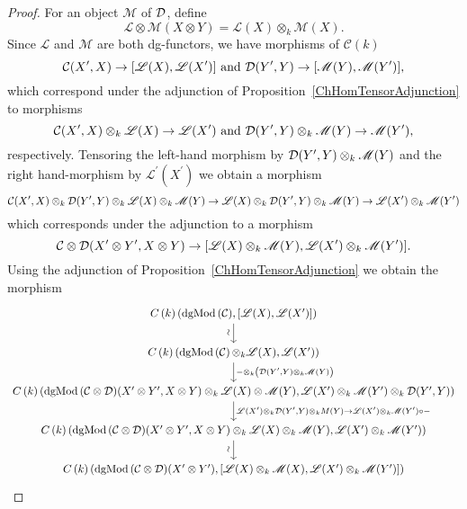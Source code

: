 \documentclass[dissertation.tex]{subfiles}
\begin{document}
\begin{lem}
  \begin{proof}
    For an object $\mathscr{M}$ of $\mathcal{D}$, define 
    $$\mathscr{L} \otimes \mathscr{M}(X \otimes Y) = \mathscr{L}(X) \otimes_k \mathscr{M}(X).$$
    Since $\mathscr{L}$ and $\mathscr{M}$ are both dg-functors, we have morphisms of $\mathcal{C}(k)$
    $$\mathcal{C}(X^\prime, X) \to [\mathscr{L}(X), \mathscr{L}(X^\prime)]\ \text{and}\ \mathcal{D}(Y^\prime, Y) \to [\mathscr{M}(Y), \mathscr{M}(Y^\prime)],$$
    which correspond under the adjunction of Proposition~\ref{ChHomTensorAdjunction} to morphisms
    $$\C(X^\prime, X) \otimes_k \mathscr{L}(X) \to \mathscr{L}(X^\prime)
    \ \text{and}\ 
    \D(Y^\prime, Y) \otimes_k \mathscr{M}(Y) \to \mathscr{M}(Y^\prime),$$
    respectively.
    Tensoring the left-hand morphism by $\mathcal{D}(Y^\prime,Y) \otimes_k \mathscr{M}(Y)$ and the right hand-morphism by $\mathscr{L^\prime}(X^\prime)$ we obtain a morphism
    $$\mathcal{C}(X^\prime, X) \otimes_k \mathcal{D}(Y^\prime, Y) \otimes_k \mathscr{L}(X) \otimes_k \mathscr{M}(Y) \to 
    \mathscr{L}(X) \otimes_k \mathcal{D}(Y^\prime,Y) \otimes_k \mathscr{M}(Y) \to
    \mathscr{L}(X^\prime) \otimes_k \mathscr{M}(Y^\prime)$$
    which corresponds under the adjunction to a morphism
    $$\mathcal{C} \otimes \mathcal{D}(X^\prime \otimes Y^\prime, X \otimes Y) \to
    [\mathscr{L}(X) \otimes_k \mathscr{M}(Y), \mathscr{L}(X^\prime) \otimes_k \mathscr{M}(Y^\prime)].$$
    Using the adjunction of Proposition~\ref{ChHomTensorAdjunction} we obtain the morphism
    $$\begin{tikzcd}
      \Ch{k}(\cdg{\C}, [\funct{L}(X), \funct{L}(X^\prime)]) \arrow{d}[rotate=90,xshift=-1ex,yshift=1ex]{\sim}\\
      \Ch{k}(\cdg{\C} \otimes_k \funct{L}(X), \funct{L}(X^\prime))\arrow{d}{- \otimes_k \left(\D(Y^\prime, Y) \otimes_k \funct{M}(Y)\right)}\\
      \Ch{k}(\cdg{\C \otimes \D}(X^\prime \otimes Y^\prime, X \otimes Y) \otimes_k \funct{L}(X) \otimes \funct{M}(Y), \funct{L}(X^\prime) \otimes_k \funct{M}(Y^\prime) \otimes_k \D(Y^\prime, Y))
      \arrow{d}{\funct{L}(X^\prime) \otimes_k \D(Y^\prime,Y) \otimes_k M(Y) \to \funct{L}(X^\prime) \otimes_k \funct{M}(Y^\prime) \circ -}\\
      \Ch{k}(\cdg{\C \otimes \D}(X^\prime \otimes Y^\prime, X \otimes Y) \otimes_k \funct{L}(X) \otimes_k \funct{M}(Y), \funct{L}(X^\prime) \otimes_k \funct{M}(Y^\prime))\arrow{d}[rotate=90,xshift=-1ex,yshift=1ex]{\sim}\\
      \Ch{k}(\cdg{\C \otimes \D}(X^\prime \otimes Y^\prime), [\funct{L}(X) \otimes_k \funct{M}(X), \funct{L}(X^\prime) \otimes_k \funct{M}(Y^\prime)])
    \end{tikzcd}$$
  \end{proof}
\end{lem}
\end{document}
